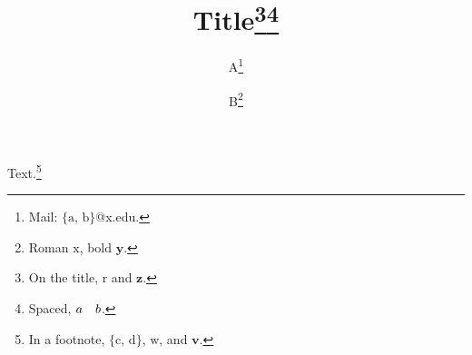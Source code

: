 \documentclass{article}
\title{Title\thanks{On the title, $\mathrm{r}$ and $\mathbf{z}$.}\thanks{Spaced, $a\hspace*{1em}b$.}}
\author{A\thanks{Mail: $\{\text{a, b}\}$@x.edu.} \and B\thanks{Roman $\mathrm{x}$, bold $\textbf{y}$.}}
\begin{document}
\maketitle
Text.\footnote{In a footnote, $\{\text{c, d}\}$, $\mathrm{w}$, and $\textbf{v}$.}
\end{document}
